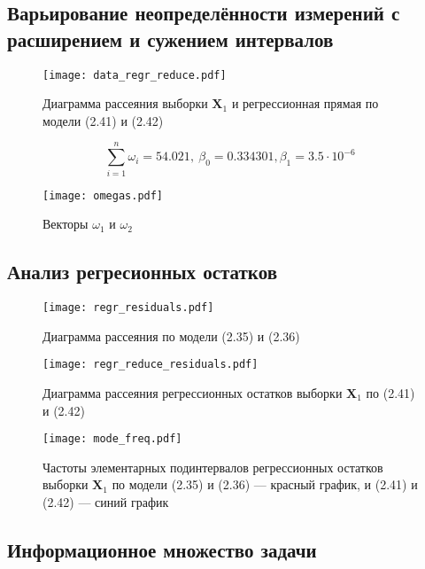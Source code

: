 \documentclass[12pt]{article}
\begin{document}
	\subsection{Варьирование неопределённости измерений с расширением и сужением интервалов}
	
	\begin{figure}[H]
		\centering
		\texttt{[image: data\_regr\_reduce.pdf]}
		\caption{Диаграмма рассеяния выборки $\mathbf{X}_1$ и регрессионная прямая
			по модели (2.41) и (2.42)}
	\end{figure}

	\begin{equation*}
		\sum\limits_{i=1}^n \omega_i = 54.021,\ \beta_0 = 0.334301, \beta_1 = 3.5 \cdot 10^{-6}
	\end{equation*}
	
	\begin{figure}[H]
		\centering
		\texttt{[image: omegas.pdf]}
		\caption{Векторы $\omega_1$ и $\omega_2$}
	\end{figure}
	
	\subsection{Анализ регресионных остатков}
	
	\begin{figure}[H]
		\centering
		\texttt{[image: regr\_residuals.pdf]}
		\caption{Диаграмма рассеяния по модели (2.35) и (2.36)}
	\end{figure}
	
	\begin{figure}[H]
		\centering
		\texttt{[image: regr\_reduce\_residuals.pdf]}
		\caption{Диаграмма рассеяния регрессионных остатков выборки $\mathbf{X}_1$ по (2.41) и (2.42)}
	\end{figure}

	\begin{figure}[H]
		\centering
		\texttt{[image: mode\_freq.pdf]}
		\caption{Частоты элементарных подинтервалов регрессионных остатков выборки $\mathbf{X}_1$ по модели (2.35) и (2.36) — красный график, и (2.41) и (2.42) — синий график}
	\end{figure}
	
	\subsection{Информационное множество задачи}
	
\end{document}
